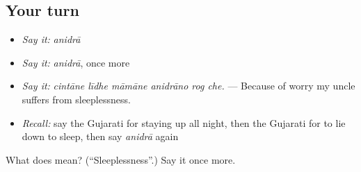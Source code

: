 \subsection*{Your turn}
\begin{itemize}
\raggedright
  \item \emph{Say it:} \emph{anidrā}
  \item \emph{Say it:} \emph{anidrā}, once more
  \item \emph{Say it:} \emph{cintāne līdhe māmāne anidrāno rog che.} — Because of worry my uncle suffers from sleeplessness.
  \item \emph{Recall:} say the Gujarati for staying up all night, then the Gujarati for to lie down to sleep, then say \emph{anidrā} again
\end{itemize}

\begin{tcolorbox}[breakable,colback=teal!4,colframe=teal!35!black,title={Before you move on}]
What does  mean? (\textquotedblleft{}Sleeplessness\textquotedblright{}.) Say it once more.
\end{tcolorbox}
